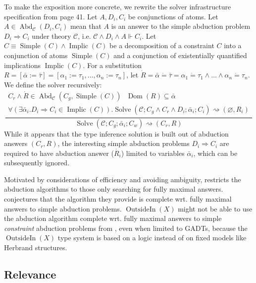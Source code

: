 \documentclass{article}
\newcommand{\assign}{:=}
\newcommand{\tmem}[1]{{\em #1\/}}
\newcommand{\tmop}[1]{\ensuremath{\operatorname{#1}}}
\begin{document}
To make the exposition more concrete, we rewrite the solver infrastructure
specification from {\cite{OutsideIn}} page 41. Let $A, D_i, C_i$ be
conjunctions of atoms. Let $A \in \tmop{Abd}_{\mathcal{C}} (D_i, C_i)$ mean
that $A$ is an answer to the simple abduction problem $D_i \Rightarrow C_i$
under theory $\mathcal{C}$, i.e. $\mathcal{C} \wedge D_i \wedge A \Vdash C_i$.
Let $C \equiv \tmop{Simple} (C) \wedge \tmop{Implic} (C)$ be a decomposition
of a constraint $C$ into a conjunction of atoms $\tmop{Simple} (C)$ and a
conjunction of existentially quantified implications $\tmop{Implic} (C)$. For
a substitution $R = [\bar{\alpha} \assign \bar{\tau}] = [\alpha_1 \assign
\tau_1, \ldots, \alpha_n \assign \tau_n]$, let $\dot{R} = \bar{\alpha} \dot{=}
\bar{\tau} = \alpha_1 \dot{=} \tau_1 \wedge \ldots \wedge \alpha_n \dot{=}
\tau_n$. We define the solver recursively:
\[ \frac{\begin{array}{l}
     C_r \wedge \dot{R} \in \tmop{Abd}_{\mathcal{C}} (C_g, \tmop{Simple} (C))
     \text{ \ \ \ } \tmop{Dom} (R) \subseteq \bar{\alpha}\\
     \forall (\exists \bar{\alpha}_i .D_i \Rightarrow C_i \in \tmop{Implic}
     (C)) . \tmop{Solve} (\mathcal{C}; C_g \wedge C_r \wedge D_i ;
     \bar{\alpha}_i ; C_i) \rightsquigarrow (\varnothing, R_i)
   \end{array}}{\tmop{Solve} (\mathcal{C}; C_g ; \bar{\alpha}_i ; C_w)
   \rightsquigarrow (C_r, R)} \]
While it appears that the type inference solution is built out of abduction
answers $(C_r, R)$, the interesting simple abduction problems $D_i \Rightarrow
C_i$ are required to have abduction answer ($\dot{R_i}$) limited to variables
$\bar{\alpha}_i$, which can be subsequently ignored.

Motivated by considerations of efficiency and avoiding ambiguity,
{\cite{OutsideIn}} restricts the abduction algorithms to those only searching
for fully maximal answers. {\cite{OutsideIn}} conjectures that the algorithm
they provide is complete wrt. fully maximal answers to simple abduction
problems. $\tmop{OutsideIn} (X)$ might not be able to use the abduction
algorithm complete wrt. fully maximal answers to simple {\tmem{constraint}}
abduction problems from {\cite{AbductionSolvMaher}}, even when limited to
GADTs, because the $\tmop{OutsideIn} (X)$ type system is based on a logic
instead of on fixed models like Herbrand structures.

\subsection{Relevance}
\end{document}

